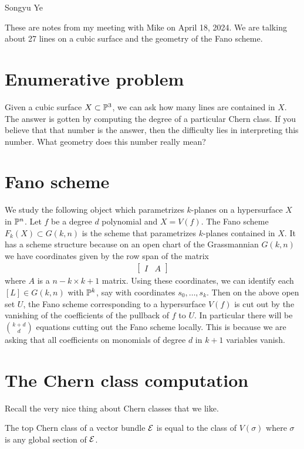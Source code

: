 \documentclass[12pt]{article}
\begin{document}
Songyu Ye

These are notes from my meeting with Mike on April 18, 2024.
We are talking about 27 lines on a cubic surface and the geometry
of the Fano scheme.

\section{Enumerative problem}
Given a cubic surface $X \subset \P^3$, we can ask how many lines
are contained in $X$. The answer is gotten by computing the
degree of a particular Chern class. If you believe that
that number is the answer, then the difficulty lies in
interpreting this number. What geometry does this number
really mean?

\section{Fano scheme}
We study the following object which parametrizes $k$-planes
on a hypersurface $X$ in $\P^n$. Let $f$ be a degree $d$ polynomial and
$X = V(f)$. The Fano scheme $F_k(X) \subset G(k,n)$
is the scheme that parametrizes
$k$-planes contained in $X$. It has a scheme structure because
on an open chart of the Grassmannian $G(k,n)$ we have coordinates
given by the row span of the matrix \begin{align*}
	\begin{bmatrix}
		I & A
	\end{bmatrix}
\end{align*} where $A$ is a $n-k \times k+1$ matrix. Using these coordinates,
we can identify each $[L] \in G(k,n)$ with $\P^k$, say with coordinates
$s_0, \ldots, s_k$. Then on the above open set $U$,
the Fano scheme corresponding to a hypersurface $V(f)$ is cut
out by the vanishing of the coefficients of the pullback of $f$ to $U$. In particular
there will be $\binom{k+d}{d}$ equations cutting out the Fano scheme locally. This is
because we are asking that all coefficients on monomials of degree $d$ in $k+1$ variables
vanish.

\section{The Chern class computation}
Recall the very nice thing about Chern classes that we like.

\begin{proposition}
    The top Chern class of a vector bundle $\cE$ is equal to the class of $V(\sigma)$
    where $\sigma$ is any global section of $\cE$.
\end{proposition}
\end{document}
